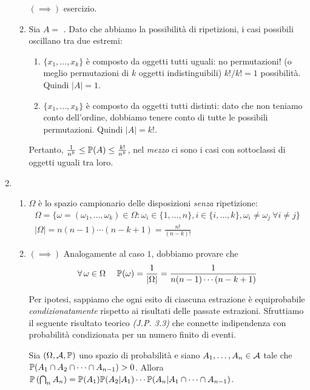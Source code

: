 \begin{enumerate}
\begin{enumerate}
		$(\implies)$ esercizio.
		\item Sia $A=$ . Dato che abbiamo la possibilità di ripetizioni, i casi possibili oscillano tra due estremi:
		\begin{enumerate}
			\item $\{x_{1},\dots,x_{k}\}$ è composto da oggetti tutti uguali: no permutazioni! (o meglio permutazioni di $k$ oggetti indistinguibili) $k!/k!=1$ possibilità. Quindi $| A| =1$.
			\item $\{x_{1},\dots,x_{k}\}$ è composto da oggetti tutti distinti: dato che non teniamo conto dell'ordine, dobbiamo tenere conto di tutte le possibili permutazioni. Quindi $| A| =k!$.
		\end{enumerate}

		Pertanto, $\frac{1}{n^{k}} \leq \mathbb{P}(A) \leq \frac{k!}{n^{k}}$, nel \textit{mezzo} ci sono i casi con sottoclassi di oggetti uguali tra loro.
	\end{enumerate}
	\item 
	\begin{enumerate}
		\item $\Omega $ è lo spazio campionario delle disposizioni \textit{senza} ripetizione:
		\begin{gather*}
			\Omega = \{\omega =(\omega_{1} ,\dots ,\omega_{k}) \in \Omega :\omega_{i} \in \{1,\dots,n\} ,i\in \{i,\dots,k\}, \omega_{i} \neq \omega_{j} \ \forall i\neq j\}\\
			|\Omega| =n(n-1) \cdots (n-k+1) =\frac{n!}{(n-k) !}
		\end{gather*}
		\item $(\implies)$ Analogamente al caso $1$, dobbiamo provare che
		\begin{equation*}
			\forall \omega \in \Omega \ \ \ \ \PP(\omega) =\frac{1}{|\Omega| } =\frac{1}{n(n-1) \cdots (n-k+1)}
		\end{equation*}

		Per ipotesi, sappiamo che ogni esito di ciascuna estrazione è equiprobabile \textit{condizionatamente} rispetto ai risultati delle passate estrazioni. Sfruttiamo il seguente risultato teorico \textit{(J.P. 3.3)} che connette indipendenza con probabilità condizionata per un numero finito di eventi.

		Sia $(\Omega,\mathcal{A},\mathbb{P})$ uno spazio di probabilità e siano $A_{1} ,\dots ,A_{n} \in \mathcal{A}$ tale che $\mathbb{P}(A_{1} \cap A_{2} \cap \cdots \cap A_{n-1})  >0$. Allora $\mathbb{P}\left(\bigcap_{n} A_{n}\right) =\mathbb{P}(A_{1})\mathbb{P}(A_{2} |A_{1}) \cdots \mathbb{P}(A_{n} |A_{1} \cap \cdots \cap A_{n-1})$.


\end{enumerate}
\end{enumerate}
